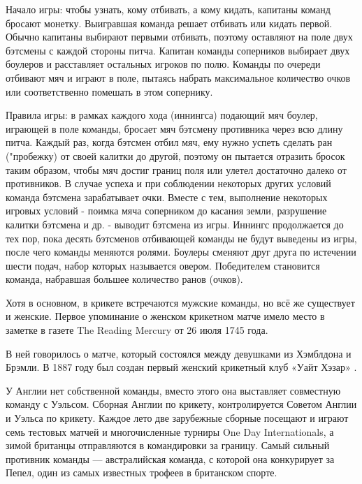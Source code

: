 Начало игры: чтобы узнать, кому отбивать, а кому кидать, капитаны команд бросают монетку. Выигравшая команда решает отбивать или кидать первой. Обычно капитаны выбирают первыми отбивать, поэтому оставляют на поле двух бэтсмены с каждой стороны питча. Капитан команды соперников выбирает двух боулеров и расставляет остальных игроков по полю. Команды по очереди отбивают мяч и играют в поле, пытаясь набрать максимальное количество очков или соответственно помешать в этом сопернику.

Правила игры: в рамках каждого хода (иннингса) подающий мяч боулер, играющей в поле команды, бросает мяч бэтсмену противника через всю длину питча. Каждый раз, когда бэтсмен отбил мяч, ему нужно успеть сделать ран ("пробежку) от своей калитки до другой, поэтому он пытается отразить бросок таким образом, чтобы мяч достиг границ поля или улетел достаточно далеко от противников. В случае успеха и при соблюдении некоторых других условий команда бэтсмена зарабатывает очки. Вместе с тем, выполнение некоторых игровых условий - поимка мяча соперником до касания земли, разрушение калитки бэтсмена и др. - выводит бэтсмена из игры. Иннингс продолжается до тех пор, пока десять бэтсменов отбивающей команды не будут выведены из игры, после чего команды меняются ролями. Боулеры сменяют друг друга по истечении шести подач, набор которых называется овером. Победителем становится команда, набравшая большее количество ранов (очков).

Хотя в основном, в крикете встречаются мужские команды, но всё же существует и женские. Первое упоминание о женском крикетном матче имело место в заметке в газете The Reading Mercury от 26 июля 1745 года.

В ней говорилось о матче, который состоялся между девушками из Хэмблдона и Брэмли. В 1887 году был создан первый женский крикетный клуб «Уайт Хэзар» \cite{cricet}.

У Англии нет собственной команды, вместо этого она выставляет совместную команду с Уэльсом. Сборная Англии по крикету, контролируется Советом Англии и Уэльса по крикету. Каждое лето две зарубежные сборные посещают и играют семь тестовых матчей и многочисленные турниры One Day Internationals, а зимой британцы отправляются в командировки за границу. Самый сильный противник команды --- австралийская команда, с которой она конкурирует за Пепел, один из самых известных трофеев в британском спорте.

